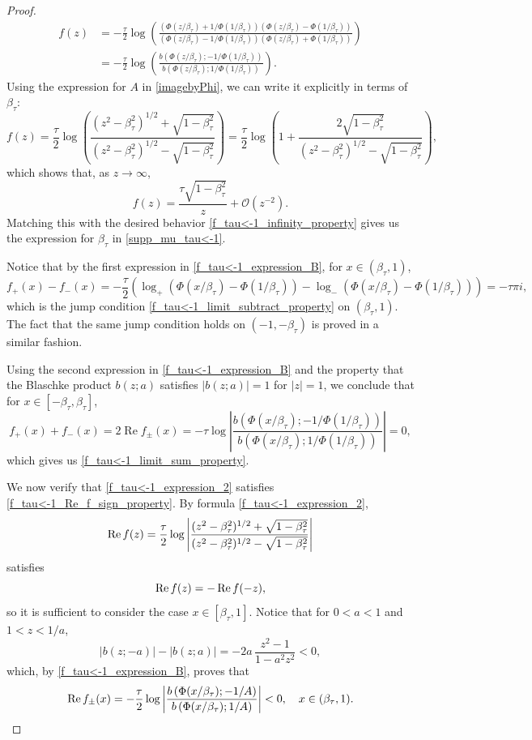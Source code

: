 \documentclass[reqno,11pt]{amsart}
\theoremstyle{plain}
\theoremstyle{definition}
\theoremstyle{remark}
\numberwithin{equation}{section}
\renewcommand{\Re}{\mathop{\rm Re}}
\begin{document}
\begin{proof}
\begin{equation}
  \label{f_tau<-1_expression_B}
  \begin{split}
 f(z)&= -\frac{\tau}{2}\log\left(\frac{(\Phi(z/\beta_\tau)+1/\Phi(1/\beta_\tau))(\Phi(z/\beta_\tau)-\Phi(1/\beta_\tau))}{(\Phi(z/\beta_\tau)-1/\Phi(1/\beta_\tau))(\Phi(z/\beta_\tau)+\Phi(1/\beta_\tau))} \right)
 \\
 &= -\frac{\tau}{2}\log\left(\frac{b\left(\Phi(z/\beta_\tau);-1/\Phi(1/\beta_\tau)\right) }{b\left(\Phi(z/\beta_\tau);1/\Phi(1/\beta_\tau)\right)} \right).
  \end{split}
\end{equation}
Using the expression for $A$ in \eqref{imagebyPhi}, we can write it explicitly in terms of $\beta_\tau$:
    \begin{equation}\label{f_tau<-1_expression_2}
        f(z)=\frac{\tau}{2}\log\left(  \frac{(z^2-\beta_\tau^2)^{1/2}+ \sqrt{1-\beta_\tau^2}}{(z^2-\beta_\tau^2)^{1/2}- \sqrt{1-\beta_\tau^2}}\right)= \frac{\tau}{2}\log\left(1+ \frac{2\sqrt{1-\beta_\tau^2}}{(z^2-\beta_\tau^2)^{1/2}- \sqrt{1-\beta_\tau^2}}\right),
    \end{equation}
which shows that, as $z\to\infty$,
    \[
    f(z)=\frac{\tau\sqrt{1-\beta_\tau^2}}{z}+\mathcal O(z^{-2}).
    \]
Matching this with the desired behavior \eqref{f_tau<-1_infinity_property} gives us the expression for $\beta_\tau$ in \eqref{supp_mu_tau<-1}. 

Notice that by the first expression in \eqref{f_tau<-1_expression_B}, for $x\in(\beta_\tau,1)$,
$$
f_+(x)-f_-(x)= -\frac{\tau}{2} \left(\log_+\left(\Phi(x/\beta_\tau)-\Phi(1/\beta_\tau)\right) - \log_-\left(\Phi(x/\beta_\tau)-\Phi(1/\beta_\tau)\right)  \right)=-\tau\pi i,
$$
which is the jump condition \eqref{f_tau<-1_limit_subtract_property} on  $ (\beta_\tau,1)$. The fact that the same jump condition holds on $(-1,-\beta_\tau)$ is proved in a similar fashion.

Using the second expression in \eqref{f_tau<-1_expression_B} and the property that the Blaschke product $b (z;a)$ satisfies $|b (z;a)|=1$ for $|z|=1$, we conclude that for $x\in [ -\beta_\tau,\beta_\tau ]$,  
$$
f_+(x)+f_-(x)= 2  \operatorname{Re}f_\pm(x) = -\tau \log\left| \frac{b\left(\Phi(x/\beta_\tau);-1/\Phi(1/\beta_\tau)\right) }{b\left(\Phi(x/\beta_\tau);1/\Phi(1/\beta_\tau)\right)} \right|=0,
$$
which gives us \eqref{f_tau<-1_limit_sum_property}.

    We now verify that \eqref{f_tau<-1_expression_2} satisfies \eqref{f_tau<-1_Re_f_sign_property}. By formula \eqref{f_tau<-1_expression_2},
    $$
       \Re f(z)=\frac{\tau}{2}\log\left|  \frac{(z^2-\beta_\tau^2)^{1/2}+ \sqrt{1-\beta_\tau^2}}{(z^2-\beta_\tau^2)^{1/2}- \sqrt{1-\beta_\tau^2}}\right|
    $$
    satisfies
    $$
      \Re f(z) = -   \Re f(-z),
    $$
    so it is sufficient to consider the case $x\in [\beta_\tau,1]$. Notice that for $0<a<1$ and $1<z<1/a$, 
    $$
    |b(z;-a)|- |b(z;a)|=-2 a\, \frac{  z^2-1 }{1-a^2
   z^2}<0,
    $$
    which, by \eqref{f_tau<-1_expression_B}, proves that 
    $$
    \Re f_\pm(x) = -\frac{\tau}{2}\log\left|\frac{b\left(\Phi(x/\beta_\tau);-1/A\right) }{b\left(\Phi(x/\beta_\tau);1/A\right)} \right|< 0, \quad x\in (\beta_\tau,1).
    $$


\end{proof}
\end{document}
